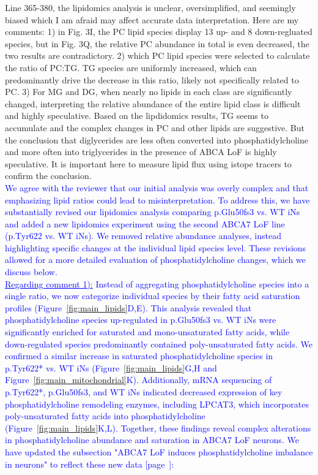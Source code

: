 \documentclass[12pt]{article}
\begin{document}
Line 365-380, the lipidomics analysis is unclear, oversimplified, and seemingly biased which I am afraid may affect accurate data interpretation. Here are my comments: 1) in Fig. 3I, the PC lipid species display 13 up- and 8 down-regluated species, but in Fig. 3Q, the relative PC abundance in total is even decreased, the two results are contradictory. 2) which PC lipid species were selected to calculate the ratio of PC:TG. TG species are uniformly increased, which can predominantly drive the decrease in this ratio, likely not specifically related to PC. 3) For MG and DG, when nearly no lipids in each class are significantly changed, interpreting the relative abundance of the entire lipid class is difficult and highly speculative. Based on the lipdidomics results, TG seems to accumulate and the complex changes in PC and other lipids are suggestive. But the conclusion that diglycerides are less often converted into phosphatidylcholine and more often into triglycerides in the presence of ABCA LoF is highly speculative. It is important here to measure lipid flux using istope tracers to confirm the conclusion.\\
\textcolor{blue}{We agree with the reviewer that our initial analysis was overly complex and that emphasizing lipid ratios could lead to misinterpretation. To address this, we have substantially revised our lipidomics analysis comparing p.Glu50fs3 vs. WT iNs and added a new lipidomics experiment using the second ABCA7 LoF line (p.Tyr622 vs. WT iNs). We removed relative abundance analyses, instead highlighting specific changes at the individual lipid species level. These revisions allowed for a more detailed evaluation of phosphatidylcholine changes, which we discuss below.}\\
\textcolor{blue}{\underline{Regarding comment 1):} Instead of aggregating phosphatidylcholine species into a single ratio, we now categorize individual species by their fatty acid saturation profiles (Figure~\ref{fig:main_lipids}D,E). This analysis revealed that phosphatidylcholine species up-regulated in p.Glu50fs3 vs. WT iNs  were significantly enriched for saturated and mono-unsaturated fatty acids, while down-regulated species predominantly contained poly-unsaturated fatty acids. We confirmed a similar increase in saturated phosphatidylcholine species in p.Tyr622* vs. WT iNs  (Figure~\ref{fig:main_lipids}G,H and Figure~\ref{fig:main_mitochondrial}K). Additionally, mRNA sequencing of p.Tyr622*, p.Glu50fs3, and WT iNs indicated decreased expression of key phosphatidylcholine remodeling enzymes, including LPCAT3, which incorporates poly-unsaturated fatty acids into phosphatidylcholine  (Figure~\ref{fig:main_lipids}K,L). Together, these findings reveal complex alterations in phosphatidylcholine abundance and saturation in ABCA7 LoF neurons. We have updated the subsection "ABCA7 LoF induces phosphatidylcholine imbalance in neurons" to reflect these new data [page~\pageref{quoteA-label}]:}
\end{document}
